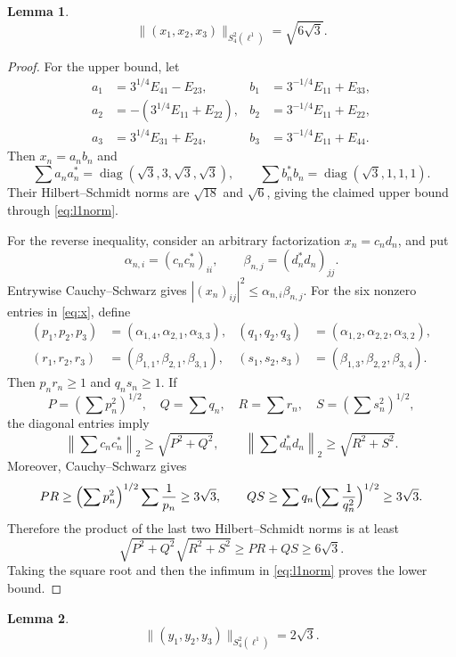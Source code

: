 \documentclass[11pt]{article}
\newtheorem{lemma}{Lemma}
\begin{document}
\begin{lemma}\label{lem:input}
\[
 \|(x_1,x_2,x_3)\|_{S_4^2(\ell^1)}=\sqrt{6\sqrt3}.
\]
\end{lemma}

\begin{proof}
For the upper bound, let
\begin{align*}
 a_1&=3^{1/4}E_{41}-E_{23},
 &b_1&=3^{-1/4}E_{11}+E_{33},\\
 a_2&=-(3^{1/4}E_{11}+E_{22}),
 &b_2&=3^{-1/4}E_{11}+E_{22},\\
 a_3&=3^{1/4}E_{31}+E_{24},
 &b_3&=3^{-1/4}E_{11}+E_{44}.
\end{align*}
Then $x_n=a_nb_n$ and
\[
 \sum a_na_n^*=\operatorname{diag}(\sqrt3,3,\sqrt3,\sqrt3),
 \qquad
 \sum b_n^*b_n=\operatorname{diag}(\sqrt3,1,1,1).
\]
Their Hilbert--Schmidt norms are $\sqrt{18}$ and $\sqrt6$, giving
the claimed upper bound through \eqref{eq:l1norm}.

For the reverse inequality, consider an arbitrary factorization
$x_n=c_nd_n$, and put
\[
 \alpha_{n,i}=(c_nc_n^*)_{ii},\qquad
 \beta_{n,j}=(d_n^*d_n)_{jj}.
\]
Entrywise Cauchy--Schwarz gives
$|(x_n)_{ij}|^2\leq\alpha_{n,i}\beta_{n,j}$.
For the six nonzero entries in \eqref{eq:x}, define
\begin{align*}
 (p_1,p_2,p_3)&=(\alpha_{1,4},\alpha_{2,1},\alpha_{3,3}),
 &(q_1,q_2,q_3)&=(\alpha_{1,2},\alpha_{2,2},\alpha_{3,2}),\\
 (r_1,r_2,r_3)&=(\beta_{1,1},\beta_{2,1},\beta_{3,1}),
 &(s_1,s_2,s_3)&=(\beta_{1,3},\beta_{2,2},\beta_{3,4}).
\end{align*}
Then $p_nr_n\geq1$ and $q_ns_n\geq1$.  If
\[
 P=(\textstyle\sum p_n^2)^{1/2},\quad Q=\sum q_n,
 \quad R=\sum r_n,\quad S=(\textstyle\sum s_n^2)^{1/2},
\]
the diagonal entries imply
\[
 \left\|\sum c_nc_n^*\right\|_2\geq\sqrt{P^2+Q^2},
 \qquad
 \left\|\sum d_n^*d_n\right\|_2\geq\sqrt{R^2+S^2}.
\]
Moreover, Cauchy--Schwarz gives
\[
 PR\geq \Bigl(\sum p_n^2\Bigr)^{1/2}\sum\frac1{p_n}
 \geq3\sqrt3,
 \qquad
 QS\geq \sum q_n\Bigl(\sum\frac1{q_n^2}\Bigr)^{1/2}
 \geq3\sqrt3.
\]
Therefore the product of the last two Hilbert--Schmidt norms is at least
\[
 \sqrt{P^2+Q^2}\sqrt{R^2+S^2}\geq PR+QS\geq6\sqrt3.
\]
Taking the square root and then the infimum in \eqref{eq:l1norm} proves
the lower bound.
\end{proof}

\begin{lemma}\label{lem:output}
\[
 \|(y_1,y_2,y_3)\|_{S_4^2(\ell^1)}=2\sqrt3.
\]
\end{lemma}
\end{document}
